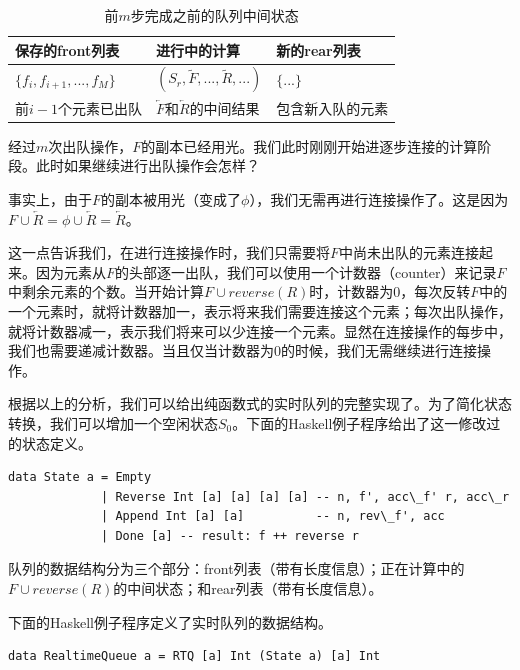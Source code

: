 \documentclass[b5paper]{ctexart}
\begin{document}
\begin{table}[htbp]
\centering
\begin{tabular}{l l l}
  保存的front列表 & 进行中的计算 & 新的rear列表 \\
  \hline
  $\{ f_i, f_{i+1}, ..., f_M \}$ & $(S_r, \tilde{F}, ..., \tilde{R}, ...)$ & $ \{ ... \}$ \\
  前$i-1$个元素已出队 & $\overleftarrow{F}$和$\overleftarrow{R}$的中间结果 & 包含新入队的元素
\end{tabular}
\caption{前$m$步完成之前的队列中间状态}
\label{tab:pop-before-m}
\end{table}

经过$m$次出队操作，$F$的副本已经用光。我们此时刚刚开始进逐步连接的计算阶段。此时如果继续进行出队操作会怎样？

事实上，由于$F$的副本被用光（变成了$\phi$），我们无需再进行连接操作了。这是因为$F \cup \overleftarrow{R} = \phi \cup \overleftarrow{R} = \overleftarrow{R}$。

这一点告诉我们，在进行连接操作时，我们只需要将$F$中尚未出队的元素连接起来。因为元素从$F$的头部逐一出队，我们可以使用一个计数器（counter）来记录$F$中剩余元素的个数。当开始计算$F \cup reverse(R)$时，计数器为0，每次反转$F$中的一个元素时，就将计数器加一，表示将来我们需要连接这个元素；每次出队操作，就将计数器减一，表示我们将来可以少连接一个元素。显然在连接操作的每步中，我们也需要递减计数器。当且仅当计数器为0的时候，我们无需继续进行连接操作。

根据以上的分析，我们可以给出纯函数式的实时队列的完整实现了。为了简化状态转换，我们可以增加一个空闲状态$S_0$。下面的Haskell例子程序给出了这一修改过的状态定义。

\lstset{language=Haskell}
\begin{lstlisting}[style=Haskell]
data State a = Empty
             | Reverse Int [a] [a] [a] [a] -- n, f', acc\_f' r, acc\_r
             | Append Int [a] [a]          -- n, rev\_f', acc
             | Done [a] -- result: f ++ reverse r
\end{lstlisting}

队列的数据结构分为三个部分：front列表（带有长度信息）；正在计算中的$F \cup reverse(R)$的中间状态；和rear列表（带有长度信息）。

下面的Haskell例子程序定义了实时队列的数据结构。

\lstset{language=Haskell}
\begin{lstlisting}[style=Haskell]
data RealtimeQueue a = RTQ [a] Int (State a) [a] Int
\end{lstlisting}
\end{document}
